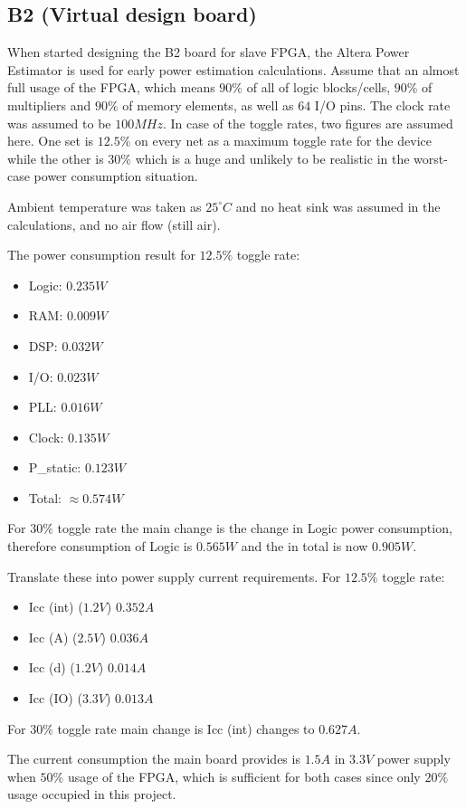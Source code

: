 \subsection{B2 (Virtual design board)}

When started designing the B2 board for slave FPGA, the Altera Power Estimator is used for early power estimation calculations. Assume that an almost full usage of the FPGA, which means $90\%$ of all of logic blocks/cells, $90\%$ of multipliers and $90\%$ of memory elements, as well as $64$ I/O pins. The clock rate was assumed to be $100MHz$. In case of the toggle rates, two figures are assumed here. One set is $12.5\%$ on every net as a maximum toggle rate for the device while the other is $30\%$ which is a huge and unlikely to be realistic in the worst-case power consumption situation.

Ambient temperature was taken as $25^{\circ} C$ and no heat sink was assumed in the calculations, and no air flow (still air).

The power consumption result for $12.5\%$ toggle rate:
\begin{itemize}
 \item Logic: $0.235 W$
 \item RAM: $0.009 W$
 \item DSP: $0.032W$
 \item I/O: $0.023 W$
 \item PLL: $0.016 W$
 \item Clock: $0.135W$
 \item P\_static: $0.123W$
 \item Total: $\approx0.574 W$
\end{itemize}
For $30\%$ toggle rate the main change is the change in Logic power consumption, therefore consumption of Logic is $0.565 W$ and the in total is now $0.905 W$.

Translate these into power supply current requirements. For $12.5\%$ toggle rate:
\begin{itemize}
 \item Icc (int) ($1.2V$) $0.352A$
 \item Icc (A) ($2.5V$) $0.036A$
 \item Icc (d) ($1.2V$) $0.014A$
 \item Icc (IO) ($3.3V$) $0.013A$
\end{itemize}

For $30\%$ toggle rate main change is Icc (int) changes to $0.627A$.

The current consumption the main board provides is $1.5A$ in $3.3V$ power supply when $50\%$ usage of the FPGA, which is sufficient for both cases since only $20\%$ usage occupied in this project.



